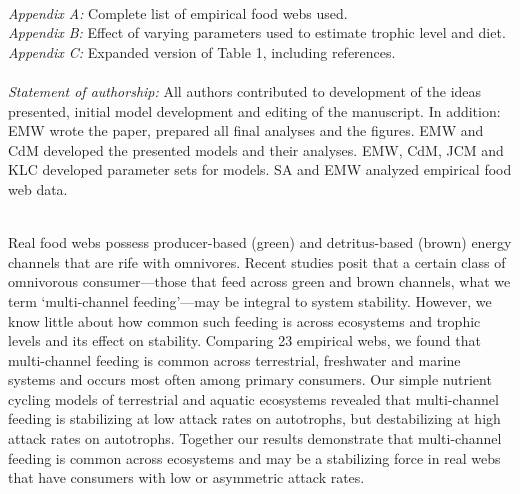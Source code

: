 \documentclass[12pt,a4paper,oneside]{article}
\begin{document}
\\
\noindent \emph{Appendix A:} Complete list of empirical food webs used.\\
\noindent \emph{Appendix B:} Effect of varying parameters used to
estimate trophic level and diet. 
\noindent \emph{Appendix C:} Expanded version of Table 1, including references. \\
\\
\noindent \emph{Statement of authorship:} All authors contributed to development of the ideas presented, initial model development and editing of the manuscript. In addition: EMW wrote the paper, prepared all final analyses and the figures. EMW and CdM developed the presented models and their analyses. EMW, CdM, JCM and KLC developed parameter sets for models. SA and EMW analyzed empirical food web data. 

\pagebreak
\linenumbers
\modulolinenumbers[2]

\\
\noindent Real food webs possess producer-based (green) and detritus-based (brown) energy channels that are rife with omnivores. Recent studies posit that a certain class of omnivorous consumer---those that feed across green and brown channels, what we term `multi-channel feeding'---may be integral to system stability. However, we know little about how common such feeding is across ecosystems and trophic levels and its effect on stability. Comparing 23 empirical webs, we found that multi-channel feeding is common across terrestrial, freshwater and marine systems and occurs most often among primary consumers. Our simple nutrient cycling models of terrestrial and aquatic ecosystems revealed that multi-channel feeding is stabilizing at low attack rates on autotrophs, but destabilizing at high attack rates on autotrophs. Together our results demonstrate that multi-channel feeding is common across ecosystems and may be a stabilizing force in real webs that have consumers with low or asymmetric attack rates.
\end{document}
